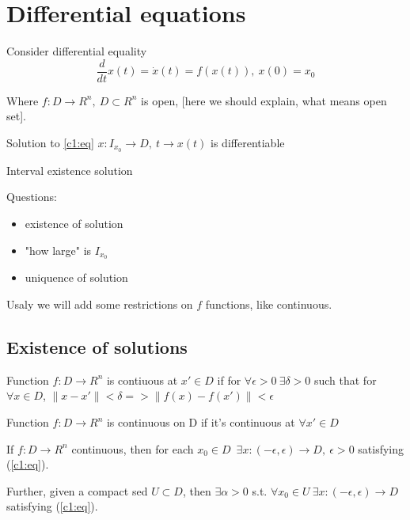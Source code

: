 \section{Differential equations}

Consider differential equality
\begin{equation}\label{c1:eq}
\frac{d}{dt}x(t)=\dot x(t)=f(x(t)), \ x(0)=x_0 
\end{equation}

Where $f:D\rightarrow R^n, \ D\subset R^n$ is open, [here we should explain,
what means open set].

Solution to \ref{c1:eq} $x:I_{x_0} \rightarrow D, \ t\rightarrow x(t)$ is
differentiable

Interval existence solution

Questions:

\begin{itemize}[label=$\#$]
\item existence of solution
\item "how large" is $I_{x_0}$
\item uniquence of solution
\end{itemize}



Usaly we will add some restrictions on $f$ functions, like continuous.

\subsection{Existence of solutions}

\begin{Definition}
Function $f:D \rightarrow R^n$ is contiuous at $x' \in D$ if for
$\forall \epsilon > 0 \ \exists \delta>0$ such that for $\forall x \in D$,
$\|x-x'\|<\delta => \|f(x)-f(x')\| < \epsilon$

Function $f:D \rightarrow R^n$ is continuous on D if it's 
continuous at $\forall x' \in D$
\end{Definition}

\begin{Theorem}[Piano]
If $f:D \rightarrow R^n$ continuous, then for each $x_0 \in D$\ 
$\exists x:(-\epsilon,\epsilon) \rightarrow D, \ \epsilon > 0$
satisfying (\ref{c1:eq}).
\end{Theorem}

Further, given a compact sed $U \subset D$, then 
$\exists \alpha > 0$ s.t. $\forall x_0 \in U 
\ \exists x:(-\epsilon,\epsilon) \rightarrow D$ satisfying (\ref{c1:eq}).


